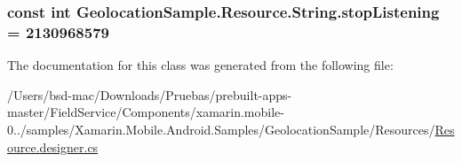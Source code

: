 \hypertarget{class_geolocation_sample_1_1_resource_1_1_string_a25eca757564b4fc2945ae40e60992bb5}{
\subsubsection[{stop\+Listening}]{\setlength{\rightskip}{0pt plus 5cm}const int Geolocation\+Sample.\+Resource.\+String.\+stop\+Listening = 2130968579}}\label{class_geolocation_sample_1_1_resource_1_1_string_a25eca757564b4fc2945ae40e60992bb5}


The documentation for this class was generated from the following file\+:\begin{DoxyCompactItemize}
\item 
/\+Users/bsd-\/mac/\+Downloads/\+Pruebas/prebuilt-\/apps-\/master/\+Field\+Service/\+Components/xamarin.\+mobile-\/0../samples/\+Xamarin.\+Mobile.\+Android.\+Samples/\+Geolocation\+Sample/\+Resources/\hyperlink{_components_2xamarin_8mobile-0_86_81_2samples_2_xamarin_8_mobile_8_android_8_samples_2_geolocati70c310c330f4a850881b004033a4fa1f}{Resource.\+designer.\+cs}\end{DoxyCompactItemize}
